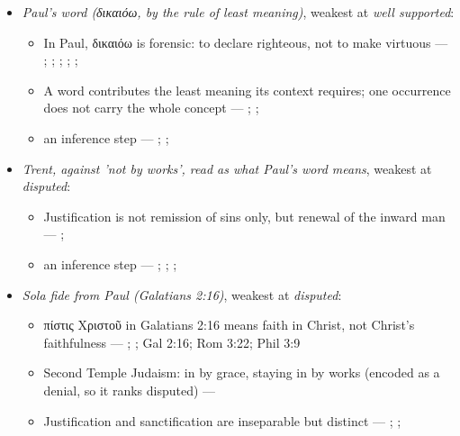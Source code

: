 \documentclass[11pt]{article}
\begin{document}
\begin{itemize}
\item \emph{Paul's word (δικαιόω, by the rule of least meaning)}, weakest at \emph{well supported}:
\begin{itemize}
\item In Paul, δικαιόω is forensic: to declare righteous, not to make virtuous --- \cite[s.v. δικαιόω]{bauer-danker-lexicon-2000}; \cite{morris-apostolic-preaching-1965}; \cite[p. 80]{moo-romans-1996}; \cite{irons-righteousness-of-god-2015}; \cite{wright-justification-2009}; \cite[ad loc. Rom 3:24]{fitzmyer-romans-1993}
\item A word contributes the least meaning its context requires; one occurrence does not carry the whole concept --- \cite{silva-biblical-words-1994}; \cite{joos-semantic-axiom-1972}; \cite{barr-semantics-2004}
\item an inference step --- \cite{silva-biblical-words-1994}; \cite[p. 80]{moo-romans-1996}; \cite{barr-semantics-2004}
\end{itemize}
\item \emph{Trent, against 'not by works', read as what Paul's word means}, weakest at \emph{disputed}:
\begin{itemize}
\item Justification is not remission of sins only, but renewal of the inward man --- \cite[Trent, Session VI (1547), Decree on Justification, ch. 7]{tanner-decrees-1990}; \cite[Trent, Session VI (1547), canon 11]{tanner-decrees-1990}
\item an inference step --- \cite[Trent, Session VI (1547), Decree on Justification, ch. 8]{tanner-decrees-1990}; \cite[Trent, Session VI (1547), Decree on Justification, ch. 7]{tanner-decrees-1990}; \cite[On the Spirit and the Letter, ch. 45 (26.45)]{npnf1-05-1887}; \cite{mcgrath-iustitia-dei-2005}
\end{itemize}
\item \emph{Sola fide from Paul (Galatians 2:16)}, weakest at \emph{disputed}:
\begin{itemize}
\item πίστις Χριστοῦ in Galatians 2:16 means faith in Christ, not Christ's faithfulness --- \cite{dunn-once-more-pistis-christou-1991}; \cite{matlock-detheologizing-2000}; Gal 2:16; Rom 3:22; Phil 3:9
\item Second Temple Judaism: in by grace, staying in by works (encoded as a denial, so it ranks disputed) --- \cite{sanders-paul-palestinian-judaism-1977}
\item Justification and sanctification are inseparable but distinct --- \cite[XIII.1]{westminster-confession-1647}; \cite[XI.1]{westminster-confession-1647}; \cite[III.xi.6]{calvin-institutes-1960}

\end{itemize}
\end{itemize}
\end{document}
